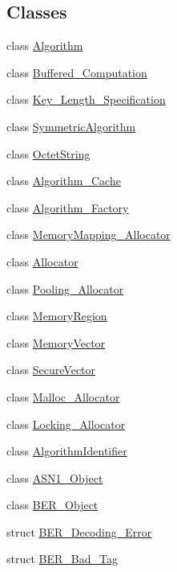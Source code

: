 \subsection*{Classes}
\begin{DoxyCompactItemize}
\item 
class \hyperlink{classBotan_1_1Algorithm}{Algorithm}
\item 
class \hyperlink{classBotan_1_1Buffered__Computation}{Buffered\-\_\-\-Computation}
\item 
class \hyperlink{classBotan_1_1Key__Length__Specification}{Key\-\_\-\-Length\-\_\-\-Specification}
\item 
class \hyperlink{classBotan_1_1SymmetricAlgorithm}{Symmetric\-Algorithm}
\item 
class \hyperlink{classBotan_1_1OctetString}{Octet\-String}
\item 
class \hyperlink{classBotan_1_1Algorithm__Cache}{Algorithm\-\_\-\-Cache}
\item 
class \hyperlink{classBotan_1_1Algorithm__Factory}{Algorithm\-\_\-\-Factory}
\item 
class \hyperlink{classBotan_1_1MemoryMapping__Allocator}{Memory\-Mapping\-\_\-\-Allocator}
\item 
class \hyperlink{classBotan_1_1Allocator}{Allocator}
\item 
class \hyperlink{classBotan_1_1Pooling__Allocator}{Pooling\-\_\-\-Allocator}
\item 
class \hyperlink{classBotan_1_1MemoryRegion}{Memory\-Region}
\item 
class \hyperlink{classBotan_1_1MemoryVector}{Memory\-Vector}
\item 
class \hyperlink{classBotan_1_1SecureVector}{Secure\-Vector}
\item 
class \hyperlink{classBotan_1_1Malloc__Allocator}{Malloc\-\_\-\-Allocator}
\item 
class \hyperlink{classBotan_1_1Locking__Allocator}{Locking\-\_\-\-Allocator}
\item 
class \hyperlink{classBotan_1_1AlgorithmIdentifier}{Algorithm\-Identifier}
\item 
class \hyperlink{classBotan_1_1ASN1__Object}{A\-S\-N1\-\_\-\-Object}
\item 
class \hyperlink{classBotan_1_1BER__Object}{B\-E\-R\-\_\-\-Object}
\item 
struct \hyperlink{structBotan_1_1BER__Decoding__Error}{B\-E\-R\-\_\-\-Decoding\-\_\-\-Error}
\item 
struct \hyperlink{structBotan_1_1BER__Bad__Tag}{B\-E\-R\-\_\-\-Bad\-\_\-\-Tag}

\end{DoxyCompactItemize}
